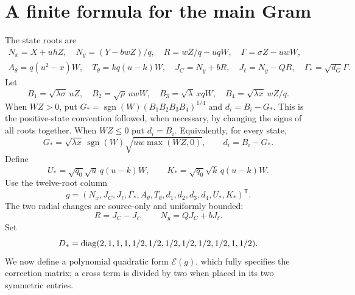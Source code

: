 \documentclass[11pt]{article}
\begin{document}
\section{A finite formula for the main Gram}

The state roots are
\[
\begin{gathered}
 N_x=X+uhZ,\quad N_y=(Y-bwZ)/q,\quad
 R=wZ/q-uqW,\quad \Gamma=\sigma Z-uwW,\\
 A_\theta=q(u^2-x)W,\quad T_\theta=kq(u-k)W,
 \quad J_C=N_y+bR,\quad J_\ell=N_y-QR,\quad
 \Gamma_*=\sqrt{d_G}\Gamma.
\end{gathered}
\]
Let
\[
 B_1=\sqrt{\lambda\sigma}\,uZ,\quad
 B_2=\sqrt\rho\,uwW,\quad
 B_3=\sqrt\lambda\,xqW,\quad
 B_4=\sqrt{\lambda x}\,wZ/q.
\]
When $WZ>0$, put
$G_*=\operatorname{sgn}(W)(B_1B_2B_3B_4)^{1/4}$ and
$d_i=B_i-G_*$. This is the positive-state convention followed,
when necessary, by changing the signs of all roots together.
When $WZ\le0$
put $d_i=B_i$. Equivalently, for every state,
\[
 G_*=\sqrt{\lambda x}\,\operatorname{sgn}(W)
                \sqrt{uw\max(WZ,0)},\qquad d_i=B_i-G_*.
\]
Define
\[
 U_*=\sqrt{q_0}\sqrt u\,q(u-k)W,
 \qquad K_*=\sqrt{q_0}\sqrt k\,q(u-k)W.
\]
Use the twelve-root column
\[
 g=(N_x,J_C,J_\ell,\Gamma_*,A_\theta,T_\theta,
                         d_1,d_2,d_3,d_4,U_*,K_*)^{\mathsf T}.
\]
The two radial changes are source-only and uniformly bounded:
\[
 R=J_C-J_\ell,\qquad N_y=QJ_C+bJ_\ell.
\]
Set
\[
 D_*={\rm diag}(2,1,1,1,1/2,1/2,1/2,1/2,1/2,1/2,1,1/2).
\]
We now define a polynomial quadratic form $\mathcal E(g)$, which
fully specifies the correction matrix; a cross term is divided by
two when placed in its two symmetric entries.
\end{document}
